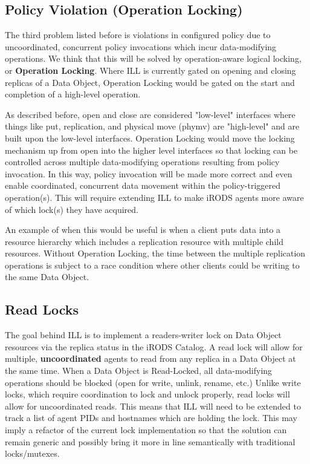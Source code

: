 \documentclass{irodsugm}
\begin{document}
\subsection*{Policy Violation (Operation Locking)}

The third problem listed before is violations in configured policy due to uncoordinated, concurrent policy invocations which incur data-modifying operations. We think that this will be solved by operation-aware logical locking, or \textbf{Operation Locking}. Where ILL is currently gated on opening and closing replicas of a Data Object, Operation Locking would be gated on the start and completion of a high-level operation.

As described before, open and close are considered "low-level" interfaces where things like put, replication, and physical move (phymv) are "high-level" and are built upon the low-level interfaces. Operation Locking would move the locking mechanism up from open into the higher level interfaces so that locking can be controlled across multiple data-modifying operations resulting from policy invocation. In this way, policy invocation will be made more correct and even enable coordinated, concurrent data movement within the policy-triggered operation(s). This will require extending ILL to make iRODS agents more aware of which lock(s) they have acquired.

An example of when this would be useful is when a client puts data into a resource hierarchy which includes a replication resource with multiple child resources.  Without Operation Locking, the time between the multiple replication operations is subject to a race condition where other clients could be writing to the same Data Object.

\subsection*{Read Locks}

The goal behind ILL is to implement a readers-writer lock\cite{readerswriterlock} on Data Object resources via the replica status in the iRODS Catalog. A read lock will allow for multiple, \textbf{uncoordinated} agents to read from any replica in a Data Object at the same time. When a Data Object is Read-Locked, all data-modifying operations should be blocked (open for write, unlink, rename, etc.) Unlike write locks, which require coordination to lock and unlock properly, read locks will allow for uncoordinated reads. This means that ILL will need to be extended to track a list of agent PIDs and hostnames which are holding the lock. This may imply a refactor of the current lock implementation so that the solution can remain generic and possibly bring it more in line semantically with traditional locks/mutexes.
\end{document}
